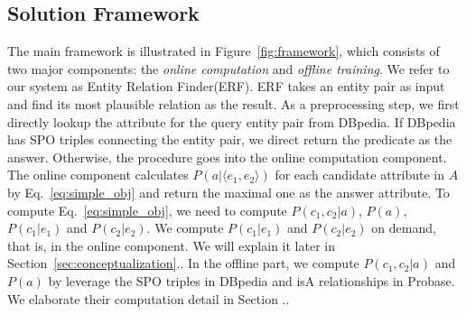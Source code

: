 
\subsection{Solution Framework}
The main framework is illustrated in Figure~\ref{fig:framework}, which consists of two major components: the {\it online computation} and {\it offline training}. We refer to our system as \ac{Entity Relation Finder(ERF)}.
ERF takes an entity pair as input and find its most plausible relation as the result.
As a preprocessing step, we first directly lookup the attribute for the query entity pair from DBpedia.
If DBpedia has SPO triples connecting the entity pair, we direct return the predicate as the answer.
Otherwise, the procedure goes into the online computation component.
The online component calculates $ P(a|  \langle e_1,e_2 \rangle  )$ for each candidate attribute in $A$ by Eq.~\ref{eq:simple_obj} and return the maximal one as the answer attribute. To compute Eq.~\ref{eq:simple_obj}, we need to compute $P(c_1,c_2|a)$, $P(a)$, $P(c_1|e_1)$ and $P(c_2|e_2)$. We compute $P(c_1|e_1)$ and $P(c_2|e_2)$ on demand, that is, in the online component. We will explain it later in Section~\ref{sec:conceptualization}.. 
In the offline part, we compute $P(c_1,c_2|a)$ and $P(a)$ by leverage the SPO triples in DBpedia and isA relationships in Probase.
We elaborate their computation detail in Section ..


